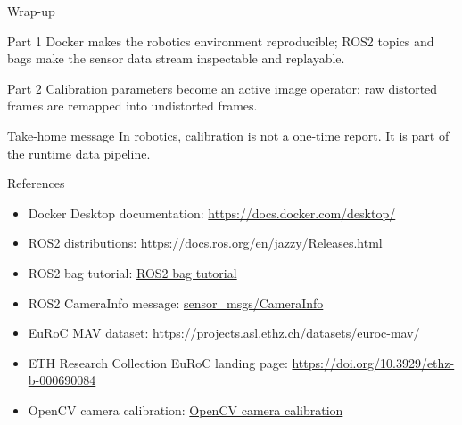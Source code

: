 \documentclass[aspectratio=169,10pt]{beamer}
\begin{document}
\begin{frame}{Wrap-up}
  \begin{block}{Part 1}
    Docker makes the robotics environment reproducible; ROS2 topics and bags make the sensor data stream inspectable and replayable.
  \end{block}
  \begin{block}{Part 2}
    Calibration parameters become an active image operator: raw distorted frames are remapped into undistorted frames.
  \end{block}
  \begin{alertblock}{Take-home message}
    In robotics, calibration is not a one-time report. It is part of the runtime data pipeline.
  \end{alertblock}
\end{frame}

\begin{frame}{References}
  \scriptsize
  \begin{itemize}
    \item Docker Desktop documentation: \href{https://docs.docker.com/desktop/}{https://docs.docker.com/desktop/}
    \item ROS2 distributions: \href{https://docs.ros.org/en/jazzy/Releases.html}{https://docs.ros.org/en/jazzy/Releases.html}
    \item ROS2 bag tutorial: \href{https://docs.ros.org/en/rolling/Tutorials/Beginner-CLI-Tools/Recording-And-Playing-Back-Data/Recording-And-Playing-Back-Data.html}{ROS2 bag tutorial}
    \item ROS2 CameraInfo message: \href{https://docs.ros.org/en/jazzy/p/sensor_msgs/msg/CameraInfo.html}{sensor\_msgs/CameraInfo}
    \item EuRoC MAV dataset: \href{https://projects.asl.ethz.ch/datasets/euroc-mav/}{https://projects.asl.ethz.ch/datasets/euroc-mav/}
    \item ETH Research Collection EuRoC landing page: \href{https://doi.org/10.3929/ethz-b-000690084}{https://doi.org/10.3929/ethz-b-000690084}
    \item OpenCV camera calibration: \href{https://docs.opencv.org/3.4/d4/d94/tutorial_camera_calibration.html}{OpenCV camera calibration}
  \end{itemize}
\end{frame}
\end{document}
